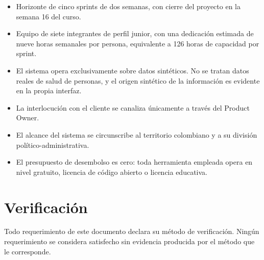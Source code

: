 \documentclass[11pt,a4paper]{article}
\begin{document}
\begin{itemize}
\item Horizonte de cinco sprints de dos semanas, con cierre del proyecto en la semana 16 del curso.
\item Equipo de siete integrantes de perfil junior, con una dedicación estimada de nueve horas semanales por persona, equivalente a 126 horas de capacidad por sprint.
\item El sistema opera exclusivamente sobre datos sintéticos. No se tratan datos reales de salud de personas, y el origen sintético de la información es evidente en la propia interfaz.
\item La interlocución con el cliente se canaliza únicamente a través del Product Owner.
\item El alcance del sistema se circunscribe al territorio colombiano y a su división político-administrativa.
\item El presupuesto de desembolso es cero: toda herramienta empleada opera en nivel gratuito, licencia de código abierto o licencia educativa.
\end{itemize}

\section{Verificación}

Todo requerimiento de este documento declara su método de verificación. Ningún requerimiento se considera satisfecho sin evidencia producida por el método que le corresponde.
\end{document}

